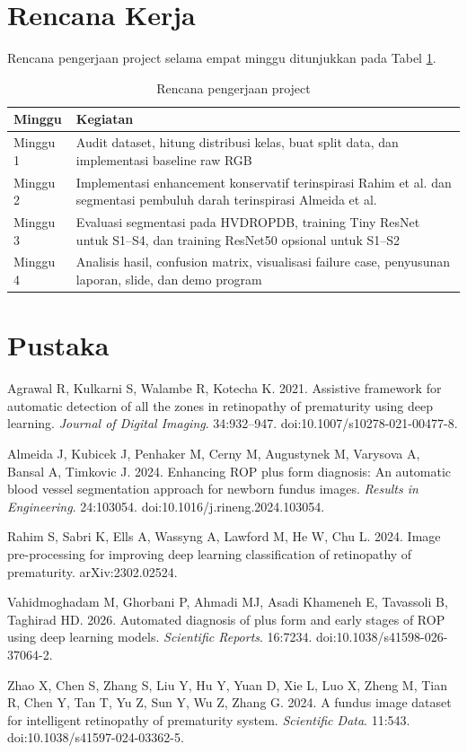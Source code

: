 \documentclass[12pt,a4paper]{article}
\begin{document}
\section*{Rencana Kerja}

Rencana pengerjaan project selama empat minggu ditunjukkan pada Tabel \ref{tab:jadwal}.

\begin{table}[h]
\centering
\caption{Rencana pengerjaan project}
\label{tab:jadwal}
\begin{tabular}{>{\raggedright\arraybackslash}p{3cm} >{\raggedright\arraybackslash}p{10cm}}
\toprule
\textbf{Minggu} & \textbf{Kegiatan} \\
\midrule
Minggu 1 & Audit dataset, hitung distribusi kelas, buat split data, dan implementasi baseline raw RGB \\
Minggu 2 & Implementasi enhancement konservatif terinspirasi Rahim et al. dan segmentasi pembuluh darah terinspirasi Almeida et al. \\
Minggu 3 & Evaluasi segmentasi pada HVDROPDB, training Tiny ResNet untuk S1--S4, dan training ResNet50 opsional untuk S1--S2 \\
Minggu 4 & Analisis hasil, confusion matrix, visualisasi failure case, penyusunan laporan, slide, dan demo program \\
\bottomrule
\end{tabular}
\end{table}

\section*{Pustaka}

Agrawal R, Kulkarni S, Walambe R, Kotecha K. 2021. Assistive framework for automatic detection of all the zones in retinopathy of prematurity using deep learning. \textit{Journal of Digital Imaging}. 34:932--947. doi:10.1007/s10278-021-00477-8.

Almeida J, Kubicek J, Penhaker M, Cerny M, Augustynek M, Varysova A, Bansal A, Timkovic J. 2024. Enhancing ROP plus form diagnosis: An automatic blood vessel segmentation approach for newborn fundus images. \textit{Results in Engineering}. 24:103054. doi:10.1016/j.rineng.2024.103054.

Rahim S, Sabri K, Ells A, Wassyng A, Lawford M, He W, Chu L. 2024. Image pre-processing for improving deep learning classification of retinopathy of prematurity. arXiv:2302.02524.

Vahidmoghadam M, Ghorbani P, Ahmadi MJ, Asadi Khameneh E, Tavassoli B, Taghirad HD. 2026. Automated diagnosis of plus form and early stages of ROP using deep learning models. \textit{Scientific Reports}. 16:7234. doi:10.1038/s41598-026-37064-2.

Zhao X, Chen S, Zhang S, Liu Y, Hu Y, Yuan D, Xie L, Luo X, Zheng M, Tian R, Chen Y, Tan T, Yu Z, Sun Y, Wu Z, Zhang G. 2024. A fundus image dataset for intelligent retinopathy of prematurity system. \textit{Scientific Data}. 11:543. doi:10.1038/s41597-024-03362-5.
\end{document}
